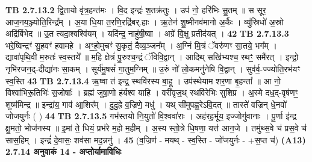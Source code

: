 \documentclass[17pt]{extarticle}
\begin{document}
{                  \newline
                                \textbf{ TB 2.7.13.2} \newline
                  द्वि॒तायो वृ॑त्र॒हन्त॑मः । वि॒द इन्द्रः॑ श॒तक्र॑तुः । उप॑ नो॒ हरि॑भिः सु॒तम् ॥ स सूर॒ आज॒नय॒ञ्ज्योति॒रिन्द्र᳚म् । अ॒या धि॒या त॒रणि॒रद्रि॑बर्.हाः । ऋ॒तेन॑ शु॒ष्मीनव॑मानो अ॒र्कैः । व्यु॑स्रिधो॑ अ॒स्रो अद्रि॑र्बिभेद ॥ उ॒त त्यदा॒श्वश्वि॑यम् । यदि॑न्द्र॒ नाहु॑षी॒ष्वा । अग्रे॑ वि॒क्षु प्रतीद॑यत् । \textbf{ 42} \newline
                  \newline
                                \textbf{ TB 2.7.13.3} \newline
                  भरे॒ष्विन्द्रꣳ॑ सु॒हवꣳ॑ हवामहे । अꣳ॒॒हो॒मुचꣳ॑ सु॒कृतं॒ दैव्य॒ञ्जन᳚म् । अ॒ग्निं मि॒त्रं ॅवरु॑णꣳ सा॒तये॒ भग᳚म् । द्यावा॑पृथि॒वी म॒रुतः॑ स्व॒स्तये᳚ ॥ म॒हि क्षेत्रं॑ पु॒रुश्च॒न्द्रं ॅविवि॒द्वान् । आदिथ् सखि॑भ्यश्च॒ रथꣳ॒॒ समै॑रत् । इन्द्रो॒ नृभि॑रजन॒द्-दीद्या॑नः सा॒कम् । सूर्य॑मु॒षसं॑ गा॒तुम॒ग्निम् ॥ उ॒रुं नो॑ लो॒कमनु॑नेषि वि॒द्वान् । सुव॑र्व॒-ज्ज्योति॒रभ॑यꣳ स्व॒स्ति \textbf{ 43} \newline
                  \newline
                                \textbf{ TB 2.7.13.4} \newline
                  ऋ॒ष्वा त॑ इन्द्र॒ स्थवि॑रस्य बा॒हू । उप॑स्थेयाम शर॒णा बृ॒हन्ता᳚ ॥ आ नो॒ विश्वा॑भिरू॒तिभिः॑ स॒जोषाः᳚ । ब्रह्म॑ जुषा॒णो ह॑र्यश्व याहि । वरी॑वृज॒थ् स्थवि॑रेभिः सुशिप्र । अ॒स्मे दध॒द्-वृष॑णꣳ॒॒ शुष्म॑मिन्द्र ॥ इन्द्रा॑य॒ गाव॑ आ॒शिर᳚म् । दु॒दु॒ह्रे व॒ज्रिणे॒ मधु॑ । यथ् सी॑मुपह्व॒रेऽवि॒दत् ॥ तास्ते॑ वज्रिन् धे॒नवो॑ जोजयुर्नः ( ) \textbf{ 44} \newline
                  \newline
                                \textbf{ TB 2.7.13.5} \newline
                  गभ॑स्तयो नि॒युतो॑ वि॒श्ववा॑राः । अह॑रह॒र्भूय॒ इज्जोगु॑वानाः । पू॒र्णा इ॑न्द्र क्षु॒मतो॒ भोज॑नस्य ॥ इ॒मां ते॒ धियं॒ प्रभ॑रे म॒हो म॒हीम् । अ॒स्य स्तो॒त्रे धि॒षणा॒ यत्त॑ आन॒जे । तमु॑थ्स॒वे च॑ प्रस॒वे च॑ सास॒हिम् । इन्द्रं॑ दे॒वासः॒ शव॑सा मद॒न्ननु॑ । \textbf{ 45} \newline
                  \newline
                                    (व॒ज्रिण॑ - मयथ् - स्व॒स्ति - जो॑जयुर्नः - +स॒प्त च॑) \textbf{(A13)} \newline \newline
                \textbf{ 2.7.14     अनुवाकं   14 - अप्तोर्यामाविधिः} \newline
}
\end{document}
